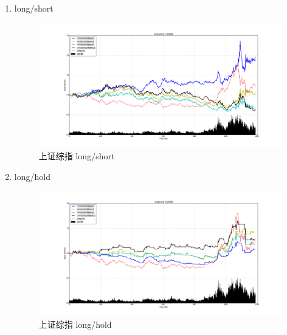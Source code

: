 \documentclass[12pt,a4paper]{article}
\begin{document}
\begin{enumerate}
\item long/short 
\begin{figure}[H]
	\centering
	\includegraphics[width=1.0\textwidth]{img_r_7/szzz.png}
	\caption{上证综指 long/short}
\end{figure}
\item long/hold 
\begin{figure}[H]
	\centering
	\includegraphics[width=1.0\textwidth]{img_r_7/szzz_1.png}
	\caption{上证综指 long/hold}
\end{figure}
\end{enumerate}
\end{document}
